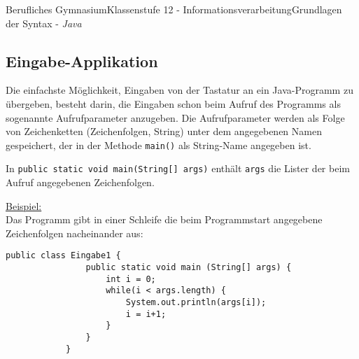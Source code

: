 \documentclass[11pt,oneside,openany,headings=optiontotoc,11pt,numbers=noenddot]{article}
\begin{document}
\begin{worksheet}{Berufliches Gymnasium}{Klassenstufe 12 - Informationsverarbeitung}{Grundlagen der Syntax - \textit{Java}}
		\subsection{Eingabe-Applikation}
		Die einfachste Möglichkeit, Eingaben von der Tastatur an ein Java-Programm zu übergeben, besteht darin, die Eingaben schon beim Aufruf des Programms als sogenannte Aufrufparameter anzugeben. Die Aufrufparameter werden als Folge von Zeichenketten (Zeichenfolgen, String) unter dem angegebenen Namen gespeichert, der in der Methode \lstinline[style=JavaInputStyle]|main()| als String-Name angegeben ist.\\
		\par\noindent
		In \lstinline[style=JavaInputStyle]|public static void main(String[] args)| enthält \lstinline[style=JavaInputStyle]|args| die Lister der beim Aufruf angegebenen Zeichenfolgen.\\
		\par\noindent
		\underline{Beispiel:}\\
		Das Programm gibt in einer Schleife die beim Programmstart angegebene Zeichenfolgen nacheinander aus:
		\begin{lstlisting}[style=JavaInputStyle]
			public class Eingabe1 {
				public static void main (String[] args) {
					int i = 0;
					while(i < args.length) {
						System.out.println(args[i]);
						i = i+1;
					}
				}
			}
		\end{lstlisting}

\end{worksheet}
\end{document}
